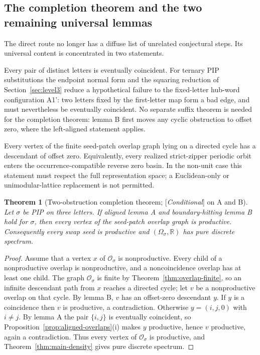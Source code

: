 \documentclass[11pt]{amsart}
\theoremstyle{plain}
\newtheorem{theorem}{Theorem}[section]
\theoremstyle{definition}
\theoremstyle{remark}
\newcommand{\R}{\mathbb{R}}
\newcommand{\PDS}{pure discrete spectrum}
\newcommand{\Status}[1]{\textup{[\textit{#1}]}}
\begin{document}
\subsection{The completion theorem and the two remaining universal lemmas}\label{sec:headline-status}

The direct route no longer has a diffuse list of unrelated conjectural steps.
Its universal content is concentrated in two statements.

\begin{description}[leftmargin=2.4em,style=nextline]
\item[Aligned lemma A (issue \#138).]
Every pair of distinct letters is eventually coincident.  For ternary PIP
substitutions the endpoint normal form and the squaring reduction of
Section~\ref{sec:level3} reduce a hypothetical failure to the fixed-letter
hub-word configuration A1': two letters fixed by the first-letter map form a
bad edge, and must nevertheless be eventually coincident.  No separate
suffix theorem is needed for the completion theorem: lemma B first moves any
cyclic obstruction to offset zero, where the left-aligned statement applies.

\item[Boundary-hitting lemma B (issue \#139).]
Every vertex of the finite seed-patch overlap graph lying on a directed cycle
has a descendant of offset zero.
Equivalently, every realized strict-zipper periodic orbit enters the
occurrence-compatible reverse zero basin.  In the non-unit case this statement
must respect the full representation space; a Euclidean-only or
unimodular-lattice replacement is not permitted.
\end{description}

\begin{theorem}[Two-obstruction completion theorem; \Status{Conditional} on A and B]\label{thm:two-obstruction-completion}
Let $\sigma$ be PIP on three letters.  If aligned lemma A and
boundary-hitting lemma B hold for $\sigma$, then every vertex of the seed-patch overlap graph is
productive.  Consequently every swap seed is productive and
$(\Omega_\sigma,\R)$ has \PDS{}.
\end{theorem}

\begin{proof}
Assume that a vertex $x$ of $\mathcal O_\sigma$ is nonproductive.  Every
child of a nonproductive overlap is nonproductive, and a noncoincidence
overlap has at least one child.  The graph $\mathcal O_\sigma$ is finite by
Theorem~\ref{thm:overlap-finite}, so an infinite descendant path from $x$
reaches a directed cycle; let $v$ be a nonproductive overlap on that cycle.  By lemma B, $v$ has
an offset-zero descendant $y$.  If $y$ is a coincidence then $v$ is
productive, a contradiction.  Otherwise $y=(i,j,0)$ with $i\ne j$.  By lemma
A the pair $\{i,j\}$ is eventually coincident, so
Proposition~\ref{prop:aligned-overlaps}(i) makes $y$ productive, hence $v$
productive, again a contradiction.  Thus every vertex of $\mathcal O_\sigma$ is productive, and
Theorem~\ref{thm:main-density} gives \PDS{}.
\end{proof}
\end{document}

